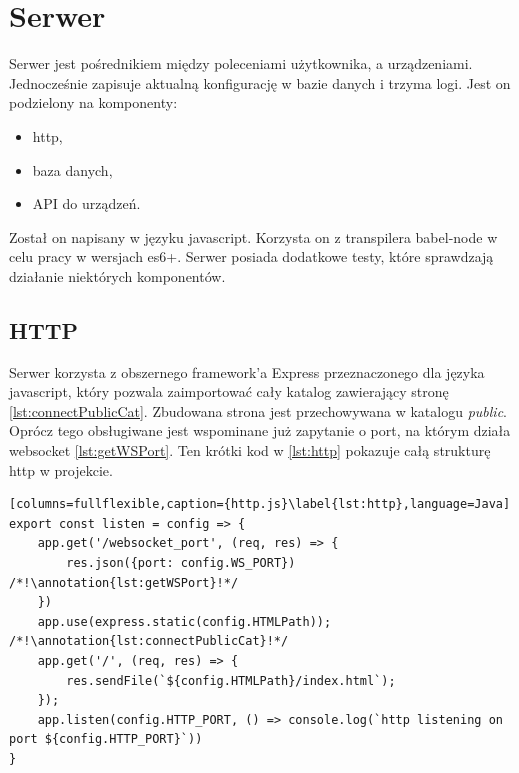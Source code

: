 \section{Serwer}
Serwer jest pośrednikiem między poleceniami użytkownika, a urządzeniami. Jednocześnie zapisuje aktualną konfigurację w bazie danych i trzyma logi. Jest on podzielony na komponenty:
\begin{itemize}
    \item http,
    \item baza danych,
    \item API do urządzeń.
\end{itemize}
Został on napisany w języku javascript. Korzysta on z transpilera babel-node w celu pracy w wersjach es6+. Serwer posiada dodatkowe testy, które sprawdzają działanie niektórych komponentów.
\subsection{HTTP}
Serwer korzysta z obszernego framework'a Express przeznaczonego dla języka javascript, który pozwala zaimportować cały katalog zawierający stronę \ref{lst:connectPublicCat}. Zbudowana strona jest przechowywana w katalogu \textit{public}. \cite{express}\\
Oprócz tego obsługiwane jest wspominane już zapytanie o port, na którym działa websocket \ref{lst:getWSPort}.
Ten krótki kod w \ref{lst:http} pokazuje całą strukturę http w projekcie.
\begin{lstlisting}[columns=fullflexible,caption={http.js}\label{lst:http},language=Java]
export const listen = config => {
    app.get('/websocket_port', (req, res) => {
        res.json({port: config.WS_PORT}) /*!\annotation{lst:getWSPort}!*/
    })
    app.use(express.static(config.HTMLPath)); /*!\annotation{lst:connectPublicCat}!*/
    app.get('/', (req, res) => {
        res.sendFile(`${config.HTMLPath}/index.html`);
    });
    app.listen(config.HTTP_PORT, () => console.log(`http listening on port ${config.HTTP_PORT}`))
}
\end{lstlisting}
